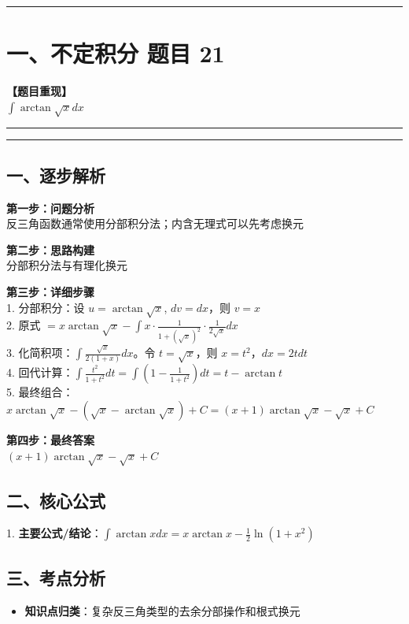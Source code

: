 ﻿\documentclass[12pt, a4paper]{ctexart}
\newcommand{\TopSeparator}{
    \par\noindent\rule{\textwidth}{1.5pt}\vspace{0.5em}
}
\newcommand{\AnalysisSeparator}{
    \par\noindent\rule{\textwidth}{0.5pt}\vspace{0.2em}\hrule\vspace{0.5em}
}
\newenvironment{RedAnalysis}{
    \par
    \color{red} 
}{
    \par
    \color{black} 
}
\begin{document}
\vspace{2em}

\TopSeparator
\section*{一、不定积分 题目 21}

\textbf{【题目重现】} \\
$\int \arctan \sqrt{x} dx$

\AnalysisSeparator

\begin{RedAnalysis}

	\subsection*{一、逐步解析}

	\textbf{第一步：问题分析} \\
	反三角函数通常使用分部积分法；内含无理式可以先考虑换元

	\textbf{第二步：思路构建} \\
	分部积分法与有理化换元

	\textbf{第三步：详细步骤} \\
	1. 分部积分：设 $u = \arctan\sqrt{x}$, $dv = dx$，则 $v = x$ \\ 
	2. 原式 $= x\arctan\sqrt{x} - \int x \cdot \frac{1}{1+(\sqrt{x})^2} \cdot \frac{1}{2\sqrt{x}} dx$ \\ 
	3. 化简积项：$\int \frac{\sqrt{x}}{2(1+x)} dx$。令 $t = \sqrt{x}$，则 $x = t^2$，$dx = 2t dt$ \\ 
	4. 回代计算：$\int \frac{t^2}{1+t^2} dt = \int (1 - \frac{1}{1+t^2}) dt = t - \arctan t$ \\ 
	5. 最终组合：$x\arctan\sqrt{x} - (\sqrt{x} - \arctan\sqrt{x}) + C = (x+1)\arctan\sqrt{x} - \sqrt{x} + C$

	\textbf{第四步：最终答案} \\
	$(x+1)\arctan\sqrt{x} - \sqrt{x} + C$

	\subsection*{二、核心公式}
	1. \textbf{主要公式/结论}：$\int \arctan x dx = x\arctan x - \frac{1}{2}\ln(1+x^2)$

	\subsection*{三、考点分析}
	\begin{itemize}
		\item \textbf{知识点归类}：复杂反三角类型的去余分部操作和根式换元
	\end{itemize}

\end{RedAnalysis}
\end{document}
